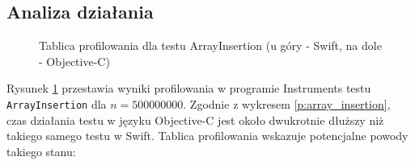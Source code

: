 \documentclass[mgr, shortabstract]{iithesis}
\begin{document}
\subsection{Analiza działania}

\begin{figure}
    \caption{Tablica profilowania dla testu ArrayInsertion (u góry - Swift, na dole - Objective-C)}
    \label{i:array_insertion}
\end{figure}

Rysunek \ref{i:array_insertion} przestawia wyniki profilowania w programie Instruments testu \texttt{ArrayInsertion} dla $n = 500000000$. Zgodnie z wykresem \ref{p:array_insertion}, czas działania testu w języku Objective-C jest około dwukrotnie dłuższy niż takiego samego testu w Swift. Tablica profilowania wskazuje potencjalne powody takiego stanu:
\end{document}
